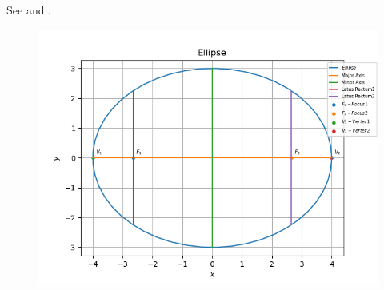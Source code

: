 See 
and
.
\begin{figure}[!h]
	\begin{center}
		\includegraphics[width=\columnwidth]{chapters/11/11/3/3/figs/conic.png}
	\end{center}
\caption{}
\label{fig:chapters/11/11/3/3/Fig1}
\end{figure}
